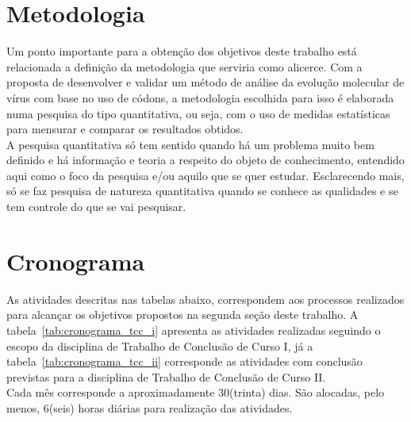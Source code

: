\chapter{Metodologia}
Um ponto importante para a obtenção dos objetivos deste trabalho está relacionada a definição da metodologia que serviria como alicerce. Com a proposta de desenvolver e validar um método de análise da evolução molecular de vírus com base no uso de códons, a metodologia escolhida para isso é elaborada numa pesquisa do tipo quantitativa, ou seja, com o uso de medidas estatísticas para mensurar e comparar os resultados obtidos.\\
A pesquisa quantitativa só tem sentido quando há um problema muito bem definido e há informação e teoria a respeito do objeto de conhecimento, entendido aqui como o foco da pesquisa e/ou aquilo que se quer estudar. Esclarecendo mais, só se faz pesquisa de natureza quantitativa quando se conhece as qualidades e se tem controle do que se vai pesquisar.\cite{da_silva_pesquisa_2014}




\chapter{Cronograma}
As atividades descritas nas tabelas abaixo, correspondem aos processos realizados para alcançar os objetivos propostos na segunda seção deste trabalho.
A tabela~\ref{tab:cronograma_tcc_i} apresenta as atividades realizadas seguindo o escopo da disciplina de Trabalho de Conclusão de Curso I, já a tabela~\ref{tab:cronograma_tcc_ii} corresponde as atividades com conclusão previstas para a disciplina de Trabalho de Conclusão de Curso II.\space\\
Cada mês corresponde a aproximadamente 30(trinta) dias. São alocadas, pelo menos, 6(seis) horas diárias para realização das atividades.

